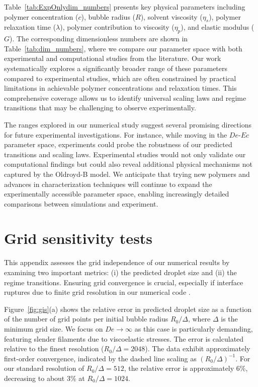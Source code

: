 \documentclass{jfm}
\newcommand{\oo}{\color{black} \normalfont}
\newcommand{\bb}{\color{black} \normalfont}
\begin{document}
Table~\ref{tab:ExpOnlydim_numbers} presents key physical parameters including polymer concentration ($c$), bubble radius ($R$), solvent viscosity ($\eta_s$), polymer relaxation time ($\lambda$), polymer contribution to viscosity ($\eta_p$), and elastic modulus ($G$). The corresponding dimensionless numbers are shown in Table~\ref{tab:dim_numbers}, where we compare our parameter space with both experimental and computational studies from the literature. Our work systematically explores a significantly broader range of these parameters compared to experimental studies, which are often constrained by practical limitations in achievable polymer concentrations and relaxation times. This comprehensive coverage allows us to identify universal scaling laws and regime transitions that may be challenging to observe experimentally.

The ranges explored in our numerical study suggest several promising directions for future experimental investigations. For instance, while moving in the $De$-$Ec$ parameter space, experiments could probe the robustness of our predicted transitions and scaling laws. Experimental studies would not only validate our computational findings but could also reveal additional physical mechanisms not captured by the Oldroyd-B model. We anticipate that trying new polymers and advances in characterization techniques \citep{gaillard2024beware} will continue to expand the experimentally accessible parameter space, enabling increasingly detailed comparisons between simulations and experiment.

\bb
\oo
\section{Grid sensitivity tests}
\label{app:gis}
\renewcommand{\thefigure}{\Alph{section}\,\arabic{figure}}
\setcounter{figure}{0}

This appendix assesses the grid independence of our numerical results by examining two important metrics: (i) the predicted droplet size and (ii) the regime transitions. Ensuring grid convergence is crucial, especially if interface ruptures due to finite grid resolution in our numerical code \citep{lohse-2020-pnas,chirco2022manifold,kant2023bag}. 

Figure~\ref{fig:gis}(a) shows the relative error in predicted droplet size as a function of the number of grid points per initial bubble radius $R_0/\Delta$, where $\Delta$ is the minimum grid size. We focus on $De \to \infty$ as this case is particularly demanding, featuring slender filaments due to viscoelastic stresses. The error is calculated relative to the finest resolution ($R_0/\Delta = 2048$). 
The data exhibit approximately first-order convergence, indicated by the dashed line scaling as $(R_0/\Delta)^{-1}$. 
For our standard resolution of $R_0/\Delta = 512$, the relative error is approximately 6\%, decreasing to about 3\% at $R_0/\Delta = 1024$.
\end{document}
